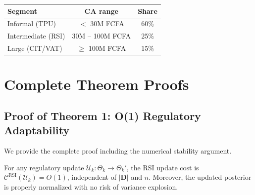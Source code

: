 \begin{center}
\begin{tabular}{lcc}
\toprule
\textbf{Segment} & \textbf{CA range} & \textbf{Share} \\
\midrule
Informal (TPU) & $<$ 30M FCFA & 60\% \\
Intermediate (RSI) & 30M -- 100M FCFA & 25\% \\
Large (CIT/VAT) & $\geq$ 100M FCFA & 15\% \\
\bottomrule
\end{tabular}
\end{center}

\section{Complete Theorem Proofs}
\label{app:proofs}

\subsection{Proof of Theorem 1: O(1) Regulatory Adaptability}

We provide the complete proof including the numerical stability argument.

\begin{theorem}
For any regulatory update $\mathcal{U}_k : \Theta_k \to \Theta_k'$,
the RSI update cost is $\mathcal{C}^{\text{RSI}}(\mathcal{U}_k) = O(1)$,
independent of $|\mathbf{D}|$ and $n$. Moreover, the updated posterior
is properly normalized with no risk of variance explosion.
\end{theorem}

